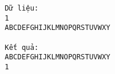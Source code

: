 \begin{verbatim}
Dữ liệu:
1
ABCDEFGHIJKLMNOPQRSTUVWXY

Kết quả:
ABCDEFGHIJKLMNOPQRSTUVWXY
1
\end{verbatim}